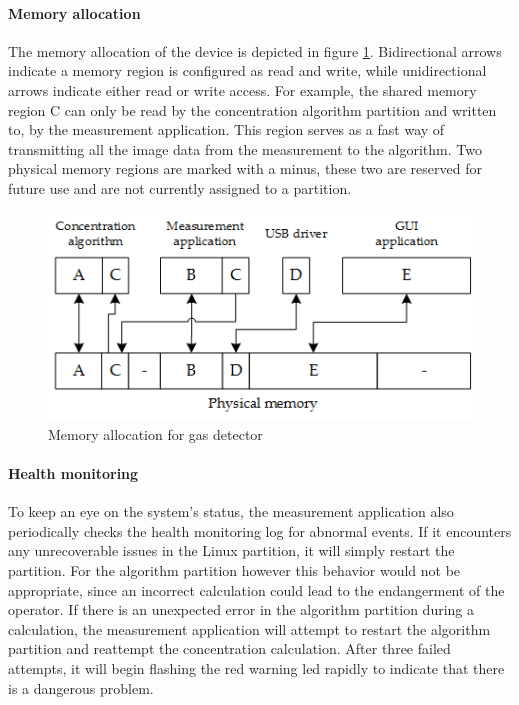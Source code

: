\paragraph{Memory allocation}
The memory allocation of the device is depicted in figure \ref{fig:gas_detect_memory_allocation}. Bidirectional arrows indicate a memory region is configured as read and write, while unidirectional arrows indicate either read or write access. For example, the shared memory region C can only be read by the concentration algorithm partition and written to, by the measurement application. This region serves as a fast way of transmitting all the image data from the measurement to the algorithm. Two physical memory regions are marked with a minus, these two are reserved for future use and are not currently assigned to a partition.

\begin{figure}[hb!]
\centering
\includegraphics[scale=1]{Figures/gas_detect_memory_allocation.png}
\decoRule
\caption{Memory allocation for gas detector}
\label{fig:gas_detect_memory_allocation}
\end{figure}

\paragraph{Health monitoring}
To keep an eye on the system's status, the measurement application also periodically checks the health monitoring log for abnormal events. If it encounters any unrecoverable issues in the Linux partition, it will simply restart the partition. 
For the algorithm partition however this behavior would not be appropriate, since an incorrect calculation could lead to the endangerment of the operator. If there is an unexpected error in the algorithm partition during a calculation, the measurement application will attempt to restart the algorithm partition and reattempt the concentration calculation. After three failed attempts, it will begin flashing the red warning \acrshort{led} rapidly to indicate that there is a dangerous problem.

